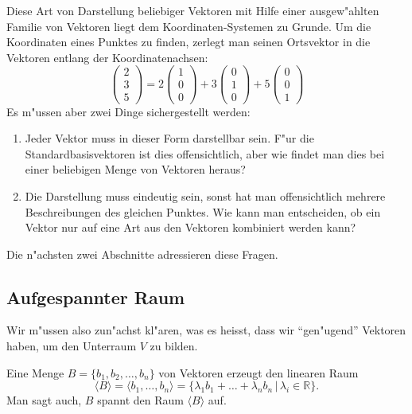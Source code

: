 Diese Art von Darstellung beliebiger Vektoren mit Hilfe einer
ausgew"ahlten Familie von Vektoren liegt dem Koordinaten-Systemen
zu Grunde. Um die Koordinaten eines Punktes zu finden, zerlegt
man seinen Ortsvektor in die Vektoren entlang der Koordinatenachsen:
\[
\begin{pmatrix}2\\3\\5\end{pmatrix}
=
2\begin{pmatrix}1\\0\\0\end{pmatrix}+
3\begin{pmatrix}0\\1\\0\end{pmatrix}+
5\begin{pmatrix}0\\0\\1\end{pmatrix}
\]
Es m"ussen aber zwei Dinge sichergestellt werden:
\begin{enumerate}
\item Jeder Vektor muss in dieser Form darstellbar sein. F"ur die
Standardbasisvektoren ist dies offensichtlich, aber wie findet man
dies bei einer beliebigen Menge von Vektoren heraus?
\item Die Darstellung muss eindeutig sein, sonst hat man offensichtlich
mehrere Beschreibungen des gleichen Punktes. Wie kann man entscheiden,
ob ein Vektor nur auf eine Art aus den Vektoren kombiniert werden kann?
\end{enumerate}
Die n"achsten zwei Abschnitte adressieren diese Fragen.

\subsection{Aufgespannter Raum}
Wir m"ussen also zun"achst kl"aren, was es heisst, dass wir ``gen"ugend''
Vektoren haben, um den Unterraum $V$ zu bilden.

\begin{definition}
Eine Menge $B=\{b_1,b_2,\dots,b_n\}$ von Vektoren erzeugt den
linearen Raum
\[
\langle B\rangle =
\langle b_1,\dots , b_n\rangle =
\{\lambda_1b_1+\dots+\lambda_nb_n\,|\,\lambda_i\in\mathbb R\}.
\]
Man sagt auch, $B$ spannt den Raum $\langle B\rangle$ auf.
\end{definition}

